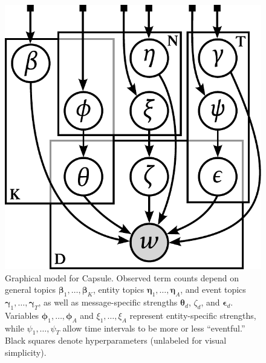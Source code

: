 \begin{figure}[bt]
\centering
\includegraphics[width=0.5\linewidth]{fig/graphicalmodel.pdf}
\caption{Graphical model for Capsule. Observed term counts depend on
  general topics $\mathbold{\beta}_1, \ldots, \mathbold{\beta}_K$,
  entity topics $\mathbold{\eta}_1, \ldots, \mathbold{\eta}_A$, and
  event topics $\mathbold{\gamma}_1, \ldots, \mathbold{\gamma}_T$, as
  well as message-specific strengths $\mathbold{\theta}_d$, $\zeta_d$,
  and $\mathbold{\epsilon}_d$.  Variables $\mathbold{\phi}_1, \ldots,
  \mathbold{\phi}_A$ and $\xi_1, \ldots, \xi_A$ represent
  entity-specific strengths, while $\psi_1, \ldots, \psi_T$ allow time
  intervals to be more or less ``eventful.'' Black squares denote
  hyperparameters (unlabeled for visual simplicity).}
\label{fig:graphicalmodel}
\end{figure}

